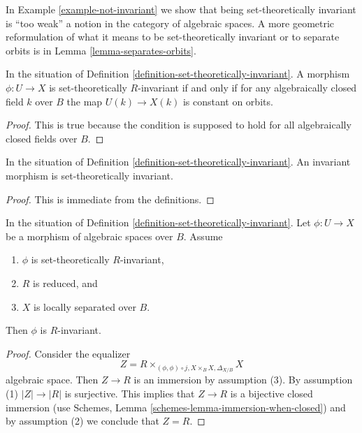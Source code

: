 \noindent
In
Example \ref{example-not-invariant}
we show that being set-theoretically invariant is ``too weak'' a notion in
the category of algebraic spaces. A more geometric reformulation
of what it means to be set-theoretically invariant or to separate orbits is in
Lemma \ref{lemma-separates-orbits}.

\begin{lemma}
\label{lemma-set-theoretic-invariant}
In the situation of Definition \ref{definition-set-theoretically-invariant}.
A morphism $\phi : U \to X$ is set-theoretically $R$-invariant if and
only if for any algebraically closed field $k$ over $B$ the map
$U(k) \to X(k)$ is constant on orbits.
\end{lemma}

\begin{proof}
This is true because the condition is supposed to hold for all algebraically
closed fields over $B$.
\end{proof}

\begin{lemma}
\label{lemma-invariant-set-theoretically-invariant}
In the situation of Definition \ref{definition-set-theoretically-invariant}.
An invariant morphism is set-theoretically invariant.
\end{lemma}

\begin{proof}
This is immediate from the definitions.
\end{proof}

\begin{lemma}
\label{lemma-set-theoretically-invariant-invariant-when-reduced}
In the situation of Definition \ref{definition-set-theoretically-invariant}.
Let $\phi : U \to X$ be a morphism of algebraic spaces over $B$.
Assume
\begin{enumerate}
\item $\phi$ is set-theoretically $R$-invariant,
\item $R$ is reduced, and
\item $X$ is locally separated over $B$.
\end{enumerate}
Then $\phi$ is $R$-invariant.
\end{lemma}

\begin{proof}
Consider the equalizer
$$
Z = R \times_{(\phi, \phi) \circ j, X \times_B X, \Delta_{X/B}} X
$$
algebraic space. Then $Z \to R$ is an immersion by assumption (3).
By assumption (1) $|Z| \to |R|$ is surjective. This implies that
$Z \to R$ is a bijective closed immersion (use
Schemes, Lemma \ref{schemes-lemma-immersion-when-closed})
and by assumption (2) we conclude that $Z = R$.
\end{proof}

